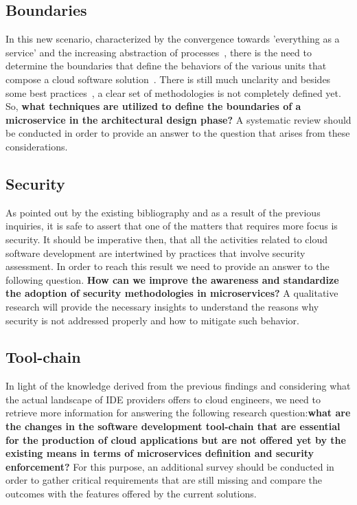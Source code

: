 \documentclass[a4paper, 10pt, conference]{ieeeconf}
\begin{document}
\subsection{Boundaries}

In this new scenario, characterized by the convergence towards 'everything as a service' and the increasing abstraction of processes~\cite{automatic-dev}, there is the need to determine the boundaries that define the behaviors of the various units that compose a cloud software solution~\cite{overview-platforms}. There is still much unclarity and besides some best practices~\cite{research-mss}, a clear set of methodologies is not completely defined yet. So, \textbf{what techniques are utilized to define the boundaries of a microservice in the architectural design phase?} A systematic review should be conducted in order to provide an answer to the question that arises from these considerations.

\subsection{Security}

As pointed out by the existing bibliography and as a result of the previous inquiries, it is safe to assert that one of the matters that requires more focus is security. It should be imperative then, that all the activities related to cloud software development are intertwined by practices that involve security assessment. In order to reach this result we need to provide an answer to the following question.
\textbf{How can we improve the awareness and standardize the adoption of security methodologies in microservices?}
A qualitative research will provide the necessary insights to understand the reasons why security is not addressed properly and how to mitigate such behavior.

\subsection{Tool-chain}

In light of the knowledge derived from the previous findings and considering what the actual landscape of IDE providers offers to cloud engineers, we need to retrieve more information for answering the following research question:\textbf{what are the changes in the software development tool-chain that are essential for the production of cloud applications but are not offered yet by the existing means in terms of microservices definition and security enforcement?}
For this purpose, an additional survey should be conducted in order to gather critical requirements that are still missing and compare the outcomes with the features offered by the current solutions.
\end{document}
